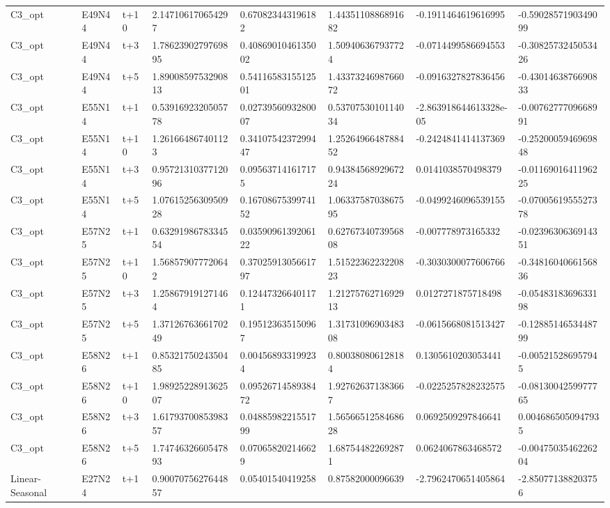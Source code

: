 \begin{landscape}
\begin{longtable}{llllllll}
C3\_opt & E49N44 & t+10 & 2.147106170654297 & 0.670823443196182 & 1.4435110886891682 & -0.1911464619616995 & -0.5902857190349099 \\
C3\_opt & E49N44 & t+3 & 1.7862390279769895 & 0.4086901046135002 & 1.509406367937724 & -0.0714499586694553 & -0.3082573245053426 \\
C3\_opt & E49N44 & t+5 & 1.8900859753290813 & 0.5411658315512501 & 1.4337324698766072 & -0.0916327827836456 & -0.4301463876690833 \\
C3\_opt & E55N14 & t+1 & 0.5391692320505778 & 0.0273956093280007 & 0.5370753010114034 & -2.863918644613328e-05 & -0.0076277709668991 \\
C3\_opt & E55N14 & t+10 & 1.261664867401123 & 0.3410754237299447 & 1.2526496648788452 & -0.2424841414137369 & -0.2520005946969848 \\
C3\_opt & E55N14 & t+3 & 0.9572131037712096 & 0.095637141617175 & 0.9438456892967224 & 0.0141038570498379 & -0.0116901641196225 \\
C3\_opt & E55N14 & t+5 & 1.0761525630950928 & 0.1670867539974152 & 1.0633758703867595 & -0.0499246096539155 & -0.0700561955527378 \\
C3\_opt & E57N25 & t+1 & 0.6329198678334554 & 0.0359096139206122 & 0.6276734073956808 & -0.007778973165332 & -0.0239630636914351 \\
C3\_opt & E57N25 & t+10 & 1.568579077720642 & 0.3702591305661797 & 1.5152236223220823 & -0.3030300077606766 & -0.3481604066156836 \\
C3\_opt & E57N25 & t+3 & 1.258679191271464 & 0.124473266401171 & 1.2127576271692913 & 0.0127271875718498 & -0.0548318369633198 \\
C3\_opt & E57N25 & t+5 & 1.3712676366170249 & 0.195123635150967 & 1.3173109690348308 & -0.0615668081513427 & -0.1288514653448799 \\
C3\_opt & E58N26 & t+1 & 0.8532175024350485 & 0.004568933199234 & 0.800380806128184 & 0.1305610203053441 & -0.005215286957945 \\
C3\_opt & E58N26 & t+10 & 1.9892522891362507 & 0.0952671458938472 & 1.927626371383667 & -0.0225257828232575 & -0.0813004259977765 \\
C3\_opt & E58N26 & t+3 & 1.6179370085398357 & 0.0488598221551799 & 1.5656651258468628 & 0.0692509297846641 & 0.0046865050947935 \\
C3\_opt & E58N26 & t+5 & 1.7474632660547893 & 0.070658202146629 & 1.687544822692871 & 0.0624067863468572 & -0.0047503546226204 \\
Linear-Seasonal & E27N24 & t+1 & 0.9007075627644857 & 0.05401540419258 & 0.87582000096639 & -2.7962470651405864 & -2.850771388203756 \\

\end{longtable}
\end{landscape}
